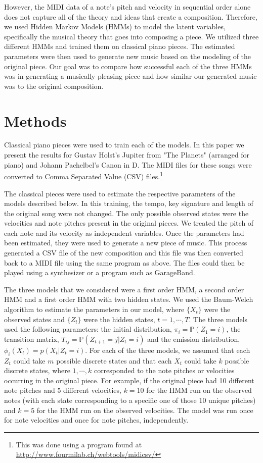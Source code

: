 \documentclass{article} %
\begin{document}
However, the MIDI data of a note's pitch and velocity in sequential order alone does not capture all of the theory and ideas that create a composition. Therefore, we used Hidden Markov Models (HMMs) to model the latent variables, specifically the musical theory that goes into composing a piece. We utilized three different HMMs and trained them on classical piano pieces. The estimated parameters were then used to generate new music based on the modeling of the original piece.  Our goal was to compare how successful each of the three HMMs was in generating a musically pleasing piece and how similar our generated music was to the original composition.

\section{Methods}

Classical piano pieces were used to train each of the models. In this paper we present the results for Gustav Holst's Jupiter from "The Planets" (arranged for piano) and Johann Pachelbel's Canon in D. The MIDI files for these songs were converted to Comma Separated Value (CSV) files.\footnote{This was done using a program found at \url{http://www.fourmilab.ch/webtools/midicsv/}} 

The classical pieces were used to estimate the respective parameters of the models described below. In this training, the tempo, key signature and length of the original song were not changed. The only possible observed states were the velocities and note pitches present in the original pieces. We treated the pitch of each note and its velocity as independent variables.  Once the parameters had been estimated, they were used to generate a new piece of music. This process generated a CSV file of the new composition and this file was then converted back to a MIDI file using the same program as above. The files could then be played using a synthesizer or a program such as GarageBand.

The three models that we considered were a first order HMM, a second order HMM and a first order HMM with two hidden states.  We used the Baum-Welch algorithm  to estimate the parameters in our model, where $\{X_t\}$ were the observed states and $\{Z_t\}$ were the hidden states, $t = 1, \cdots, T$.  The three models used the following parameters: the initial distribution, $\pi_i = \mathbb{P}(Z_1 = i)$, the transition matrix, $T_{ij} = \mathbb{P}(Z_{t+1} = j | Z_t = i)$ and the emission distribution, $\phi_i (X_t) = p(X_t | Z_t = i)$. For each of the three models, we assumed that each $Z_t$ could take $m$ possible discrete states and that each $X_t$ could take $k$  possible discrete states, where $1, \cdots, k$ corresponded to the note pitches or velocities occurring in the original piece. For example, if the original piece had 10 different note pitches and 5 different velocities, $k=10$ for the HMM run on the observed notes (with each state corresponding to a specific one of those 10 unique pitches) and $k=5$ for the HMM run on the observed velocities.  
The model was run once for note velocities and once for note pitches, independently. 
\end{document}
